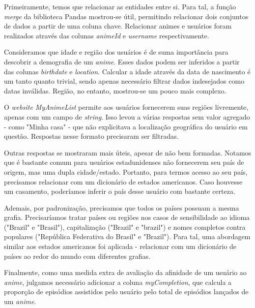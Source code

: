 \documentclass{article}
\begin{document}
Primeiramente, temos que relacionar as entidades entre si. Para tal, a função \textit{merge} da biblioteca Pandas mostrou-se útil, permitindo relacionar dois conjuntos de dados a partir de uma coluna chave. Relacionar animes e usuários foram realizados através das colunas \textit{animeId} e \textit{username} respectivamente.\par

Consideramos que idade e região dos usuários é de suma importância para descobrir a demografia de um \textit{anime}. Esses dados podem ser inferidos a partir das colunas \textit{birthdate} e \textit{location}. Calcular a idade através da data de nascimento é um tanto quanto trivial, sendo apenas necessário filtrar dados indesejados como datas inválidas. Região, no entanto, mostrou-se um pouco mais complexo.\par

O \textit{website MyAnimeList} permite aos usuários fornecerem suas regiões livremente, apenas com um campo de \textit{string}. Isso levou a várias respostas sem valor agregado - como "Minha casa" - que não explicitava a localização geográfica do usuário em questão. Respostas nesse formato precisaram ser filtradas. \par

Outras respostas se mostraram mais úteis, apesar de não bem formadas. Notamos que é bastante comum para usuários estadunidenses não fornecerem seu país de origem, mas uma dupla cidade/estado. Portanto, para termos acesso ao seu país, precisamos relacionar com um dicionário de estados americanos. Caso houvesse um casamento, poderíamos inferir o país desse usuário com bastante certeza.\par

Ademais, por padronização, precisamos que todos os países possuam a mesma grafia. Precisaríamos tratar países ou regiões nos casos de sensibilidade ao idioma ("Brazil" e "Brasil"), capitalização ("Brazil" e "brazil") e nomes completos contra populares ("República Federativa do Brasil" e "Brazil"). Para tal, uma abordagem similar aos estados americanos foi aplicada - relacionar com um dicionário de países ao redor do mundo com diferentes grafias.\par

Finalmente, como uma medida extra de avaliação da afinidade de um usuário ao \textit{anime}, julgamos necessário adicionar a coluna \textit{myCompletion}, que calcula a proporção de episódios assistidos pelo usuário pelo total de episódios lançados de um \textit{anime}.\par
\end{document}

